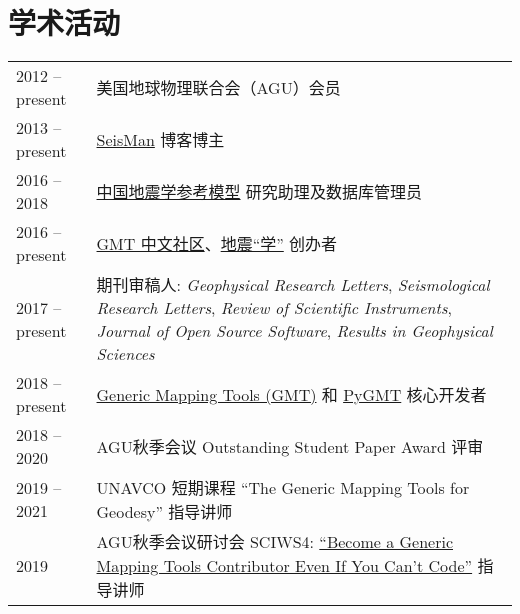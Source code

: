 \section*{学术活动}

\newcommand{\tabitem}{~~\llap{\textbullet}~~}

\begin{tabular}{p{} p{}}
2012 -- present & 美国地球物理联合会（AGU）会员 \\
2013 -- present & \href{https://blog.seisman.info}{SeisMan} 博客博主 \\
2016 -- 2018    & \href{http://chinageorefmodel.org/}{中国地震学参考模型} 研究助理及数据库管理员 \\
2016 -- present & \href{http://gmt-china.org/}{GMT 中文社区}、\href{https://seismo-learn.org/}{地震``学''} 创办者 \\
2017 -- present & 期刊审稿人:
                  \textit{Geophysical Research Letters},
                  \textit{Seismological Research Letters},
                  \textit{Review of Scientific Instruments},
                  \textit{Journal of Open Source Software},
                  \textit{Results in Geophysical Sciences} \\
2018 -- present & \href{https://github.com/GenericMappingTools/gmt}{Generic Mapping Tools (GMT)} 和 \href{https://github.com/GenericMappingTools/pygmt}{PyGMT} 核心开发者 \\
2018 -- 2020 & AGU秋季会议 Outstanding Student Paper Award 评审 \\
2019 -- 2021 & UNAVCO 短期课程 ``The Generic Mapping Tools for Geodesy'' 指导讲师 \\
2019 & AGU秋季会议研讨会 SCIWS4: \href{https://www.agu.org/Events/SCIWS4-Generic-Mapping-Tools}{``Become a Generic Mapping Tools Contributor Even If You Can't Code''} 指导讲师 \\
\end{tabular}
